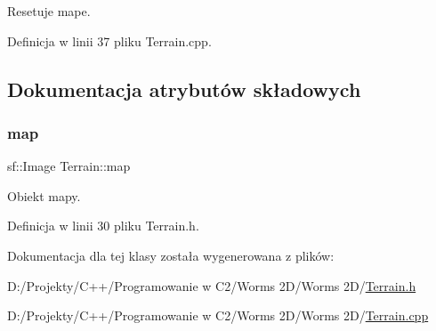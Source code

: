 Resetuje mape. 



Definicja w linii 37 pliku Terrain.\+cpp.



\subsection{Dokumentacja atrybutów składowych}
\mbox{\label{class_terrain_afda7533fb267038f082301a417691483}} 
\subsubsection{\texorpdfstring{map}{map}}
{\footnotesize\ttfamily sf\+::\+Image Terrain\+::map}



Obiekt mapy. 



Definicja w linii 30 pliku Terrain.\+h.



Dokumentacja dla tej klasy została wygenerowana z plików\+:\begin{DoxyCompactItemize}
\item 
D\+:/\+Projekty/\+C++/\+Programowanie w C2/\+Worms 2\+D/\+Worms 2\+D/\mbox{\hyperlink{_terrain_8h}{Terrain.\+h}}\item 
D\+:/\+Projekty/\+C++/\+Programowanie w C2/\+Worms 2\+D/\+Worms 2\+D/\mbox{\hyperlink{_terrain_8cpp}{Terrain.\+cpp}}\end{DoxyCompactItemize}

